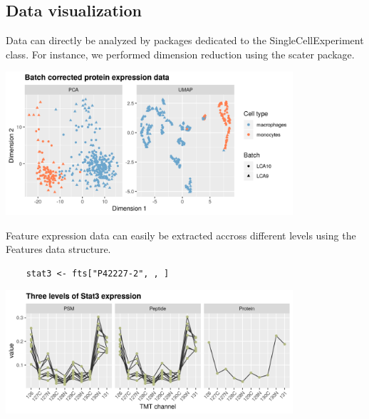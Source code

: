 \documentclass{article}
\newcommand{\hcode}[2][lgray]{{\ttfamily\color{vdgray}\colorbox{#1}{#2}}}
\begin{document}
\begin{multicols}{2}
\begin{minipage}[t]{\linewidth}
  \section*{\huge Data visualization}
  \large
  Data can directly be analyzed by packages dedicated to the \hcode{SingleCellExperiment} class. For instance, we performed dimension reduction using the \hcode{scater} package. 
  \begin{center}
    \includegraphics[width=0.8\textwidth, trim={0 0 0 0}, clip]{figs/dimred.png}
  \end{center}
  Feature expression data can easily be extracted accross different levels using the \hcode{Features} data structure.
  \begin{lstlisting}
    stat3 <- fts["P42227-2", , ]
  \end{lstlisting}
  \vspace{-0.5cm}
  \begin{center}
  \includegraphics[width=0.8\textwidth, trim={0 0 0 0}, clip]{figs/Stat.png}
  \end{center}
  
\end{minipage}

\noindent
\begin{minipage}[t]{\linewidth}

\end{minipage}
\end{multicols}
\end{document}

